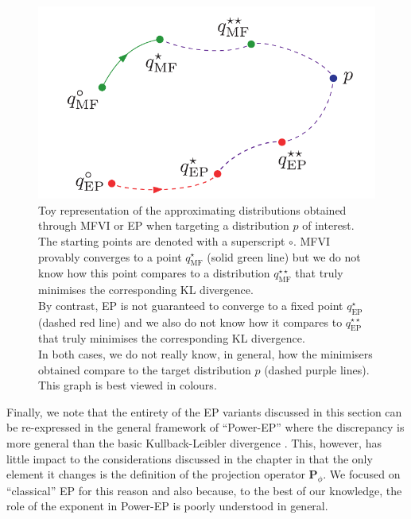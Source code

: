 \begin{figure}[!h]
\center
\includegraphics[width=.6\textwidth]{figures/general/vi-ep-space}
\vspace*{.2cm}
\caption{\label{comp-vi-ep}Toy representation of the approximating distributions obtained through MFVI or EP when targeting a distribution $p$ of interest. The starting points are denoted with a superscript $\circ$. MFVI provably converges to a point $q^{\star}_{\text{MF}}$ (solid green line) but we do not know how this point compares to a distribution $q^{\star\star}_{\text{MF}}$ that truly minimises the corresponding KL divergence.\\ By contrast, EP is not guaranteed to converge to a fixed point $q^{\star}_{\text{EP}}$ (dashed red line) and we also do not know how it compares to $q^{\star\star}_{\text{EP}}$ that truly minimises the corresponding KL divergence. \\
In both cases, we do not really know, in general, how the minimisers obtained compare to the target distribution $p$ (dashed purple lines). This graph is best viewed in colours. }
\end{figure}

Finally, we note that the entirety of the EP variants discussed in this section can be re-expressed in the general framework of ``Power-EP'' \citep{minka04} where the discrepancy is more general than the basic Kullback-Leibler divergence \citep{hernandez15, li16}. This, however, has little impact to the considerations discussed in the chapter in that the only element it changes is the definition of the projection operator $\mathbf P_{\phi}$. We focused on ``classical'' EP for this reason and also because, to the best of our knowledge, the role of the exponent in Power-EP is poorly understood in general.%



